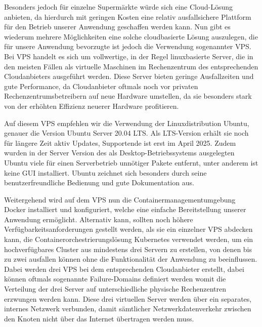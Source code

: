 Besonders jedoch für einzelne Supermärkte würde sich eine Cloud-Lösung anbieten, da hierdurch mit geringen Kosten eine relativ ausfallsichere Plattform für den Betrieb unserer Anwendung geschaffen werden kann.
Nun gibt es wiederum mehrere Möglichkeiten eine solche cloudbasierte Lösung auszulegen, die für unsere Anwendung bevorzugte ist jedoch die Verwendung sogenannter \ac{VPS}.
Bei \ac{VPS} handelt es sich um vollwertige, in der Regel linuxbasierte Server, die in den meisten Fällen als virtuelle Maschinen im Rechenzentrum des entsprechenden Cloudanbieters ausgeführt werden.
Diese Server bieten geringe Ausfallzeiten und gute Performance, da Cloudanbieter oftmals noch vor privaten Rechenzentrumsbetreibern auf neue Hardware umstellen, da sie besonders stark von der erhöhten Effizienz neuerer Hardware profitieren.

Auf diesem VPS empfehlen wir die Verwendung der Linuxdistribution Ubuntu, genauer die Version Ubuntu Server 20.04 LTS. 
Als \ac{LTS}-Version erhält sie noch für längere Zeit aktiv Updates, Supportende ist erst im April 2025.
Zudem wurden in der Server Version des als Desktop-Betriebssystems ausgelegten Ubuntu viele für einen Serverbetrieb unnötiger Pakete entfernt, unter anderem ist keine \ac{GUI} installiert.
Ubuntu zeichnet sich besonders durch seine benutzerfreundliche Bedienung und gute Dokumentation aus.

Weitergehend wird auf dem \ac{VPS} nun die Containermanagementumgebung Docker installiert und konfiguriert, welche eine einfache Bereitstellung unserer Anwendung ermöglicht.
Alternativ kann, sollten noch höhere Verfügbarkeitsanforderungen gestellt werden, als sie ein einzelner \ac{VPS} abdecken kann, die Containerorchestrierungslösung Kubernetes verwendet werden, um ein hochverfügbares Cluster aus mindestens drei Servern zu erstellen, von denen bis zu zwei ausfallen können ohne die Funktionalität der Anwendung zu beeinflussen.
Dabei werden drei \ac{VPS} bei dem entsprechenden Cloudanbieter erstellt, dabei können oftmals sogenannte Failure-Domains definiert werden womit die Verteilung der drei Server auf unterschiedliche
physische Rechenzentren erzwungen werden kann. 
Diese drei virtuellen Server werden über ein separates, internes Netzwerk verbunden, damit sämtlicher Netzwerkdatenverkehr zwischen den Knoten nicht über das Internet übertragen werden muss.